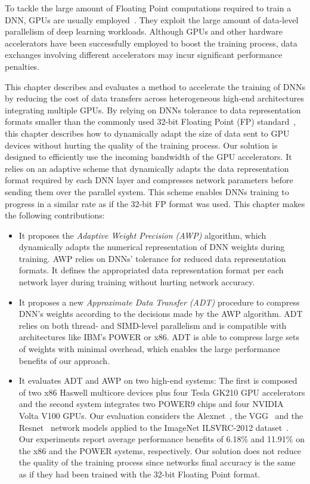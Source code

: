 To tackle the large amount of Floating Point computations required to train a
DNN, GPUs are usually employed~\cite{You17}. They exploit the large amount of
data-level parallelism of deep learning workloads. Although GPUs and other
hardware accelerators have been successfully employed to boost the training
process, data exchanges involving different accelerators may incur
significant performance penalties.

This chapter describes and evaluates a method to accelerate the training of
DNNs by reducing the cost of data transfers across heterogeneous high-end
architectures integrating multiple GPUs. By relying on DNNs tolerance to data
representation formats smaller than the commonly used 32-bit Floating Point
(FP) standard~\cite{gupta15, flexpoint17}, this chapter describes how to
dynamically adapt the size of data sent to GPU devices without hurting the
quality of the training process. Our solution is designed to efficiently use
the incoming bandwidth of the GPU accelerators. It relies on an adaptive
scheme that dynamically adapts the data representation format required by
each DNN layer and compresses network parameters before sending them over the
parallel system. This scheme enables DNNs training to progress in a similar
rate as if the 32-bit FP format was used. This chapter makes the following
contributions:

\begin{itemize}

\item It proposes the {\it Adaptive Weight Precision (AWP)} algorithm, which 
dynamically adapts the numerical representation of DNN weights during training. 
AWP relies on DNNs' tolerance for reduced data representation formats.  
It defines the appropriated data representation format per each network layer during  
training without hurting network accuracy.

\item It proposes a new {\it Approximate Data Transfer (ADT)} procedure to compress 
DNN's weights according to the decisions made by the AWP algorithm. 
ADT relies on both thread- and SIMD-level parallelism  
and is compatible with architectures like IBM's POWER 
or x86. ADT is able to compress large 
sets of weights with minimal overhead, which enables the large performance benefits of our approach.

\item It evaluates ADT and AWP on 
two high-end systems: The first is composed of two x86 Haswell multicore 
devices plus four Tesla GK210 GPU accelerators and the second system integrates two POWER9 chips and four NVIDIA Volta V100 GPUs. 
Our evaluation considers the Alexnet~\cite{alexnet}, the VGG~\cite{vgg} and the Resnet~\cite{resnet} network models applied to 
the ImageNet ILSVRC-2012 dataset~\cite{imagenet}.
Our experiments report average performance benefits of 6.18\% and 11.91\% on the x86 and the POWER systems, respectively.
Our solution does not reduce the quality of the training process since networks final accuracy is the same as if they had been trained with the 32-bit Floating Point format.
\end{itemize}

